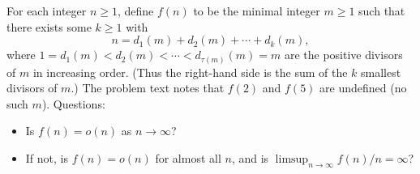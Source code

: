 For each integer $n\ge 1$, define $f(n)$ to be the minimal integer $m\ge 1$ such that there exists some $k\ge 1$ with
\[
n = d_1(m)+d_2(m)+\cdots + d_k(m),
\]
where $1=d_1(m)<d_2(m)<\cdots<d_{\tau(m)}(m)=m$ are the positive divisors of $m$ in increasing order.
(Thus the right-hand side is the sum of the $k$ smallest divisors of $m$.)
The problem text notes that $f(2)$ and $f(5)$ are undefined (no such $m$).
Questions:
\begin{itemize}
\item Is $f(n)=o(n)$ as $n\to\infty$?
\item If not, is $f(n)=o(n)$ for almost all $n$, and is $\limsup_{n\to\infty} f(n)/n=\infty$?
\end{itemize}
